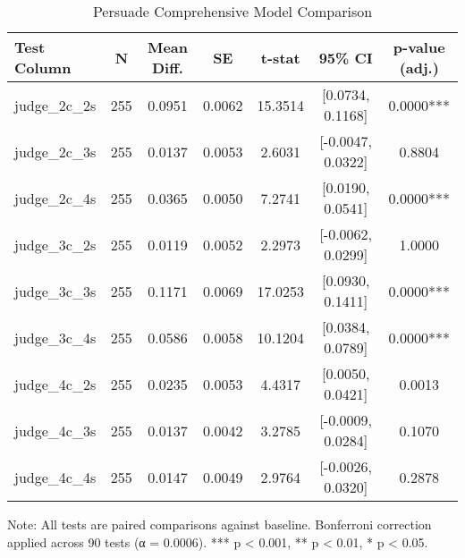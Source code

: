
\begin{table}[htbp]
\centering
\begin{threeparttable}
\caption{Persuade Comprehensive Model Comparison}
\label{tab:test_results}
\begin{tabular}{lcccccc}
\toprule
Test Column & N & Mean Diff. & SE & t-stat & 95\% CI & p-value (adj.) \\
\midrule
judge\_2c\_2s & 255 & 0.0951 & 0.0062 & 15.3514 & [0.0734, 0.1168] & 0.0000*** \\
judge\_2c\_3s & 255 & 0.0137 & 0.0053 & 2.6031 & [-0.0047, 0.0322] & 0.8804 \\
judge\_2c\_4s & 255 & 0.0365 & 0.0050 & 7.2741 & [0.0190, 0.0541] & 0.0000*** \\
judge\_3c\_2s & 255 & 0.0119 & 0.0052 & 2.2973 & [-0.0062, 0.0299] & 1.0000 \\
judge\_3c\_3s & 255 & 0.1171 & 0.0069 & 17.0253 & [0.0930, 0.1411] & 0.0000*** \\
judge\_3c\_4s & 255 & 0.0586 & 0.0058 & 10.1204 & [0.0384, 0.0789] & 0.0000*** \\
judge\_4c\_2s & 255 & 0.0235 & 0.0053 & 4.4317 & [0.0050, 0.0421] & 0.0013 \\
judge\_4c\_3s & 255 & 0.0137 & 0.0042 & 3.2785 & [-0.0009, 0.0284] & 0.1070 \\
judge\_4c\_4s & 255 & 0.0147 & 0.0049 & 2.9764 & [-0.0026, 0.0320] & 0.2878 \\
\bottomrule
\end{tabular}
\begin{tablenotes}
\small
\item Note: All tests are paired comparisons against baseline. 
Bonferroni correction applied across 90 tests (α = 0.0006). 
*** p < 0.001, ** p < 0.01, * p < 0.05. 
\end{tablenotes}
\end{threeparttable}
\end{table}